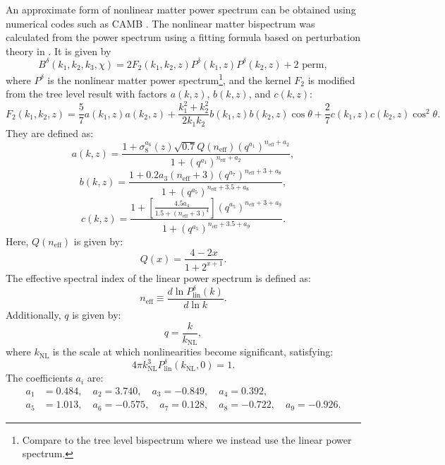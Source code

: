 \documentclass[11pt]{article} %
\begin{document}
An approximate form of nonlinear matter power spectrum can be obtained using numerical codes such as CAMB \cite{Lewis2000}. The nonlinear matter bispectrum was calculated from the power spectrum using a fitting formula based on perturbation theory in \cite{bispfit}. It is given by
\begin{equation}
    B^\delta(k_1, k_2, k_3, \chi) = 2 F_2(k_1, k_2, z) P^\delta(k_1, z) P^\delta(k_2, z) + \text{2 perm},
\end{equation}
where \( P^\delta \) is the nonlinear matter power spectrum\footnote{Compare to the tree level bispectrum where we instead use the linear power spectrum.}, and the kernel \( F_2 \) is modified from the tree level result with factors \( a(k, z) \), \( b(k, z) \), and \( c(k, z) \):
\begin{equation}
    F_2(k_1, k_2, z) = \frac{5}{7} a(k_1, z) a(k_2, z) + \frac{k_1^2 + k_2^2}{2 k_1 k_2} b(k_1, z) b(k_2, z) \cos \theta + \frac{2}{7} c(k_1, z) c(k_2, z) \cos^2 \theta.
\end{equation}
They are defined as:
\begin{equation}
    a(k, z) = \frac{1 + \sigma_8^{a_6}(z) \sqrt{0.7} Q(n_{\text{eff}}) (q^{a_1})^{n_{\text{eff}} + a_2}}{1 + (q^{a_1})^{n_{\text{eff}} + a_2}},
\end{equation}
\begin{equation}
    b(k, z) = \frac{1 + 0.2 a_3 (n_{\text{eff}} + 3) (q^{a_7})^{n_{\text{eff}} + 3 + a_8}}{1 + (q^{a_5})^{n_{\text{eff}} + 3.5 + a_8}},
\end{equation}
\begin{equation}
    c(k, z) = \frac{1 + \left[ \frac{4.5 a_4}{1.5 + (n_{\text{eff}} + 3)^4} \right] (q^{a_5})^{n_{\text{eff}} + 3 + a_9}}{1 + (q^{a_5})^{n_{\text{eff}} + 3.5 + a_9}}.
\end{equation}
Here, \( Q(n_{\text{eff}}) \) is given by:
\begin{equation}
    Q(x) = \frac{4 - 2x}{1 + 2^{x+1}}.
\end{equation}
The effective spectral index of the linear power spectrum is defined as:
\begin{equation}
    n_{\text{eff}} \equiv \frac{d \ln P^\delta_{\text{lin}}(k)}{d \ln k}.
\end{equation}
Additionally, \( q \) is given by:
\begin{equation}
    q = \frac{k}{k_{\text{NL}}},
\end{equation}
where \( k_{\text{NL}} \) is the scale at which nonlinearities become significant, satisfying:
\begin{equation}
    4 \pi k_{\text{NL}}^3 P^\delta_{\text{lin}}(k_{\text{NL}}, 0) = 1.
\end{equation}
The coefficients \( a_i \) are:
\begin{align*}
    a_1 &= 0.484, \quad a_2 = 3.740, \quad a_3 = -0.849, \quad a_4 = 0.392, \\
    a_5 &= 1.013, \quad a_6 = -0.575, \quad a_7 = 0.128, \quad a_8 = -0.722, \quad a_9 = -0.926.
\end{align*}
\end{document}

